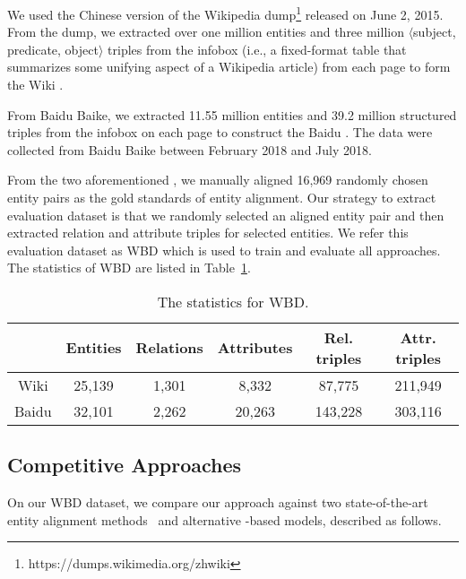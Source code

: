 	We used the Chinese version of the Wikipedia dump\footnote{https://dumps.wikimedia.org/zhwiki} released on June 2, 2015.
    From the dump, we extracted over one million entities and three million $\langle$subject, predicate, object$\rangle$ triples from the infobox (i.e., a fixed-format table that summarizes some unifying aspect of a Wikipedia article) from each page to form the Wiki \KG.
	
	 From Baidu Baike, we extracted 11.55 million entities and 39.2 million structured triples from the infobox on each page to construct the Baidu \KG. 
	The data were collected from Baidu Baike between February 2018 and July 2018.

	
	 From the two aforementioned \KGs, we manually aligned 16,969 randomly chosen entity pairs as the gold standards of entity alignment. 
	Our strategy to extract evaluation dataset is that we randomly selected an aligned entity pair and then extracted relation and attribute triples for selected entities. 
	We refer this evaluation dataset as WBD which is used to train and evaluate all approaches. The statistics of WBD are listed in Table~\ref{dataset}.
	


	\begin{table}
	\centering
	\scriptsize
	\begin{tabular}{cccccc}
		\toprule
		&\bf  Entities &\bf  Relations &\bf  Attributes &\bf  Rel. triples &\bf  Attr. triples \\
		\midrule
		Wiki & 25,139 & 1,301 & 8,332 & 87,775 & 211,949 \\ 
		Baidu & 32,101 & 2,262 & 20,263 & 143,228 & 303,116 \\
		\bottomrule
	\end{tabular}
	\caption{The statistics for WBD.}
	\label{dataset}
\end{table}


	\subsection{Competitive Approaches}
	On our WBD dataset, we compare our approach against two state-of-the-art entity alignment methods~\cite{hao2016joint,zhu2017iterative} and alternative \GCN-based models, described as follows.

